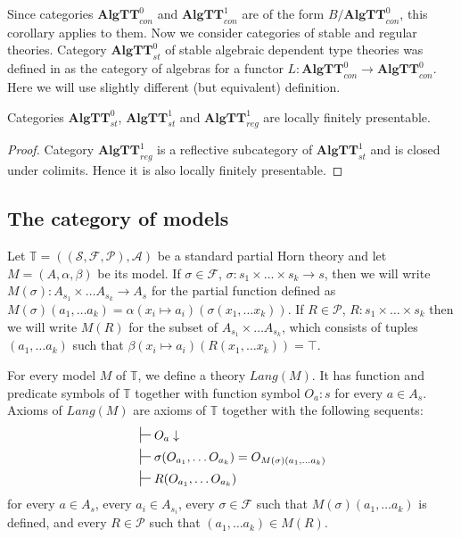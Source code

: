 \documentclass[reqno]{amsart}
\theoremstyle{definition}
\theoremstyle{remark}
\newcommand{\cat}[1]{\mathbf{#1}}
\newcommand{\algtt}{\cat{AlgTT}}
\numberwithin{figure}{section}
\begin{document}
Since categories $\algtt^0_{con}$ and $\algtt^1_{con}$ are of the form $B/\algtt^0_{con}$, this corollary applies to them.
Now we consider categories of stable and regular theories.
Category $\algtt^0_{st}$ of stable algebraic dependent type theories was defined in \cite{alg-tt} as the category of algebras for a functor $L : \algtt^0_{con} \to \algtt^0_{con}$.
Here we will use slightly different (but equivalent) definition.

\begin{cor}
Categories $\algtt^0_{st}$, $\algtt^1_{st}$ and $\algtt^1_{reg}$ are locally finitely presentable.
\end{cor}
\begin{proof}
Category $\algtt^1_{reg}$ is a reflective subcategory of $\algtt^1_{st}$ and is closed under colimits.
Hence it is also locally finitely presentable.
\end{proof}

\subsection{The category of models}

Let $\mathbb{T} = ((\mathcal{S},\mathcal{F},\mathcal{P}),\mathcal{A})$ be a standard partial Horn theory and let $M = (A,\alpha,\beta)$ be its model.
If $\sigma \in \mathcal{F}$, $\sigma : s_1 \times \ldots \times s_k \to s$, then we will write $M(\sigma) : A_{s_1} \times \ldots A_{s_k} \to A_s$
    for the partial function defined as $M(\sigma)(a_1, \ldots a_k) = \alpha(x_i \mapsto a_i)(\sigma(x_1, \ldots x_k))$.
If $R \in \mathcal{P}$, $R : s_1 \times \ldots \times s_k$ then we will write $M(R)$ for the subset of $A_{s_1} \times \ldots A_{s_k}$,
    which consists of tuples $(a_1, \ldots a_k)$ such that $\beta(x_i \mapsto a_i)(R(x_1, \ldots x_k)) = \top$.

For every model $M$ of $\mathbb{T}$, we define a theory $Lang(M)$.
It has function and predicate symbols of $\mathbb{T}$ together with function symbol $O_a : s$ for every $a \in A_s$.
Axioms of $Lang(M)$ are axioms of $\mathbb{T}$ together with the following sequents:
\begin{align*}
& \sststile{}{} O_a \downarrow \\
& \sststile{}{} \sigma(O_{a_1}, \ldots O_{a_k}) = O_{M(\sigma)(a_1, \ldots a_k)} \\
& \sststile{}{} R(O_{a_1}, \ldots O_{a_k})
\end{align*}
for every $a \in A_s$, every $a_i \in A_{s_i}$,
every $\sigma \in \mathcal{F}$ such that $M(\sigma)(a_1, \ldots a_k)$ is defined,
and every $R \in \mathcal{P}$ such that $(a_1, \ldots a_k) \in M(R)$.
\end{document}
